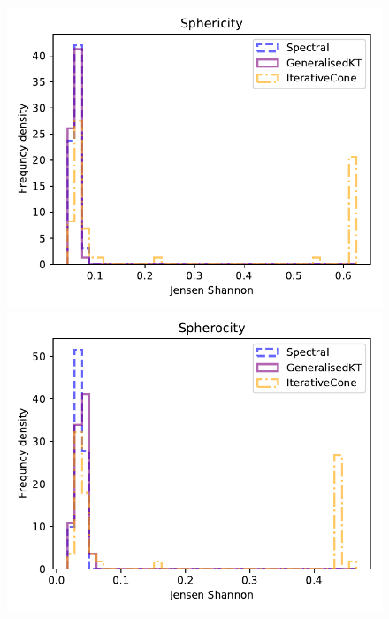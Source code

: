 \begin{figure}[htp]
\begin{minipage}[c]{0.5\textwidth}
        \includegraphics[width=1.\textwidth]{graphics/js_scores/sphericity}
    \end{minipage}\hfill
    \begin{minipage}[c]{0.5\textwidth}
        \includegraphics[width=1.\textwidth]{graphics/js_scores/spherocity}
    \end{minipage}
    \begin{minipage}[c]{0.5\textwidth}

\end{minipage}
\end{figure}
